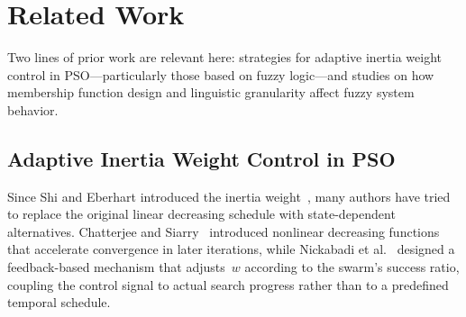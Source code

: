\documentclass[conference]{IEEEtran}
\begin{document}
\section{Related Work}
\label{sec:related_work}

Two lines of prior work are relevant here: strategies for adaptive inertia weight control in PSO---particularly those based on fuzzy logic---and studies on how membership function design and linguistic granularity affect fuzzy system behavior.

\subsection{Adaptive Inertia Weight Control in PSO}
\label{subsec:rw_adaptive_w}

Since Shi and Eberhart introduced the inertia weight~\cite{shi1998modified}, many authors have tried to replace the original linear decreasing schedule with state-dependent alternatives. Chatterjee and Siarry~\cite{chatterjee2006nonlinear} introduced nonlinear decreasing functions that accelerate convergence in later iterations, while Nickabadi et al.~\cite{nickabadi2011novel} designed a feedback-based mechanism that adjusts~$w$ according to the swarm's success ratio, coupling the control signal to actual search progress rather than to a predefined temporal schedule.
\end{document}
